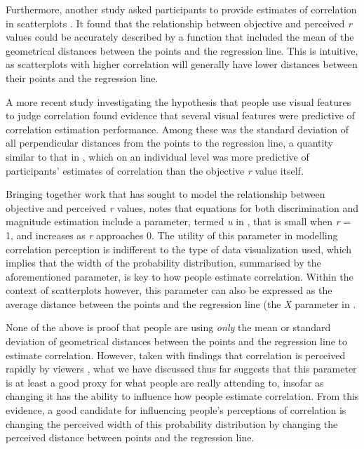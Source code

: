 \documentclass[preprint, 3p,
authoryear]{elsarticle} %
\begin{document}
Furthermore, another study asked participants to provide estimates of
correlation in scatterplots \citep{meyer_1997}. It found that the
relationship between objective and perceived \emph{r} values could be
accurately described by a function that included the mean of the
geometrical distances between the points and the regression line. This
is intuitive, as scatterplots with higher correlation will generally
have lower distances between their points and the regression line.

A more recent study investigating the hypothesis that people use visual
features to judge correlation \citep{yang_2019} found evidence that
several visual features were predictive of correlation estimation
performance. Among these was the standard deviation of all perpendicular
distances from the points to the regression line, a quantity similar to
that in \citet{meyer_1997}, which on an individual level was more
predictive of participants' estimates of correlation than the objective
\emph{r} value itself.

Bringing together work that has sought to model the relationship between
objective and perceived \emph{r} values, \citet{rensink_2017} notes that
equations for both discrimination and magnitude estimation include a
parameter, termed \emph{u} in \citet{rensink_2017}, that is small when
\emph{r} = 1, and increases as \emph{r} approaches 0. The utility of
this parameter in modelling correlation perception is indifferent to the
type of data visualization used, which implies that the width of the
probability distribution, summarised by the aforementioned parameter, is
key to how people estimate correlation. Within the context of
scatterplots however, this parameter can also be expressed as the
average distance between the points and the regression line (the
\emph{X} parameter in \citep{meyer_1997}.

None of the above is proof that people are using \emph{only} the mean or
standard deviation of geometrical distances between the points and the
regression line to estimate correlation. However, taken with findings
that correlation is perceived rapidly by viewers \citep{rensink_2014},
what we have discussed thus far suggests that this parameter is at least
a good proxy for what people are really attending to, insofar as
changing it has the ability to influence how people estimate
correlation. From this evidence, a good candidate for influencing
people's perceptions of correlation is changing the perceived width of
this probability distribution by changing the perceived distance between
points and the regression line.
\end{document}
